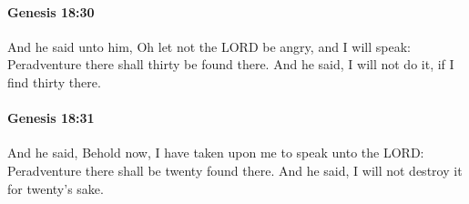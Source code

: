 		\paragraph{Genesis 18:30} %
			\label{GENESIS-18-30}

			And he said unto him, Oh let not the LORD be angry, and I will speak: Peradventure there shall thirty be found there. And he said, I will not do it, if I find thirty there.


		\paragraph{Genesis 18:31} %
			\label{GENESIS-18-31}

			And he said, Behold now, I have taken upon me to speak unto the LORD: Peradventure there shall be twenty found there. And he said, I will not destroy it for twenty's sake.


